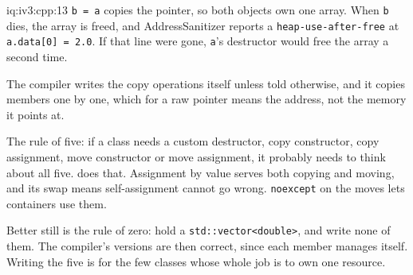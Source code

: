 \begin{solution}{iq:iv3:cpp:13}
\texttt{b = a} copies the pointer, so both objects own one array. When \texttt{b} dies, the array is freed, and AddressSanitizer reports a \texttt{heap-use-after-free} at \texttt{a.data[0] = 2.0}. If that line were gone, \texttt{a}'s destructor would free the array a second time.

The compiler writes the copy operations itself unless told otherwise, and it copies members one by one, which for a raw pointer means the address, not the memory it points at.

The rule of five: if a class needs a custom destructor, copy constructor, copy assignment, move constructor or move assignment, it probably needs to think about all five.  does that. Assignment by value serves both copying and moving, and its swap means self-assignment cannot go wrong. \texttt{noexcept} on the moves lets containers use them.
\label{lst:iv3:cp:bufferfive}

Better still is the rule of zero: hold a \texttt{std::vector<double>}, and write none of them. The compiler's versions are then correct, since each member manages itself. Writing the five is for the few classes whose whole job is to own one resource.

\end{solution}

